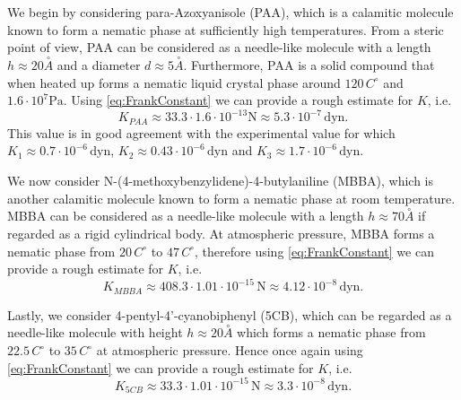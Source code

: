 \documentclass[%
 aip,
 amsmath,amssymb,
 reprint,%
]{revtex4-1}
\begin{document}
We begin by considering para-Azoxyanisole (PAA), which is a calamitic molecule known to form a nematic phase at sufficiently high temperatures.
From a steric point of view, PAA can be considered as a needle-like molecule with a length $h\approx 20 \overset{\circ}{A}$ and a diameter $d\approx 5 \overset{\circ}A$\cite{dGJ}.
Furthermore, PAA is a solid compound that when heated up forms a nematic liquid crystal phase around $120\,C^\circ$ and $1.6\cdot 10^{7} \text{Pa}$\cite{dGJ,DCJ71}.
Using \eqref{eq:FrankConstant} we can provide a rough estimate for $K$, i.e.
\begin{equation}
  K_{PAA} \approx 33.3 \cdot 1.6\cdot 10^{-13} \text{N} \approx 5.3\cdot 10^{-7} \,\text{dyn}.
\end{equation}
This value is in good agreement with the experimental value for which $K_1\approx 0.7\cdot 10^{-6}\,\text{dyn}$, $K_2\approx 0.43\cdot 10^{-6}\,\text{dyn}$ and $K_3\approx 1.7 \cdot 10^{-6}\,\text{dyn}$\cite{dGJ}.

We now consider N-(4-methoxybenzylidene)-4-butylaniline (MBBA), which is another calamitic molecule known to form a nematic phase at room temperature. MBBA can be considered as a needle-like molecule with a length $h\approx 70 \overset{\circ}{A}$ if regarded as a rigid cylindrical body\cite{CRB71}.
At atmospheric pressure, MBBA forms a nematic phase from $20\,C^\circ$ to $47\,C^\circ$, therefore using \eqref{eq:FrankConstant} we can provide a rough estimate for $K$, i.e.
\begin{equation}
  K_{MBBA} \approx 408.3 \cdot 1.01\cdot 10^{-15} \,\text{N}\approx 4.12\cdot 10^{-8} \, \text{dyn}. 
\end{equation}

Lastly, we consider 4-pentyl-4'-cyanobiphenyl (5CB), which can be regarded as a needle-like molecule with height $h\approx 20 \overset{\circ}{A}$\cite{Z} which forms a nematic phase from $22.5\,C^\circ$ to $35\,C^\circ$ at atmospheric pressure.
Hence once again using \eqref{eq:FrankConstant} we can provide a rough estimate for $K$, i.e.
\begin{equation}
  K_{5CB} \approx 33.3 \cdot 1.01\cdot 10^{-15} \,\text{N}\approx 3.3\cdot 10^{-8} \, \text{dyn}.
\end{equation}
\end{document}
